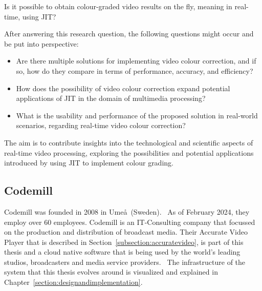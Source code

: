 \documentclass[../MasterThesis.tex]{subfiles}
\begin{document}
	\begin{researchbox}
		Is it possible to obtain colour-graded video results on the fly, meaning in real-time, using JIT?
	\end{researchbox}
	
	After answering this research question, the following questions might occur and be put into perspective:
	
	\begin{itemize}
		\item Are there multiple solutions for implementing video colour correction, and if so, how do they compare in terms of performance, accuracy, and efficiency?
		\item How does the possibility of video colour correction expand potential applications of JIT in the domain of multimedia processing?
		\item What is the usability and performance of the proposed solution in real-world scenarios, regarding real-time video colour correction?
	\end{itemize}
	
	The aim is to contribute insights into the technological and scientific aspects of real-time video processing, exploring the possibilities and potential applications introduced by using JIT to implement colour grading. 
	
	
	
	
	
	
	
	\subsection{Codemill} \label{subsection:codemill}
	
	Codemill was founded in 2008 in Ume\aa \ (Sweden).~\cite{codemill_now, codemill_old, codemill_linkedin}
	As of February 2024, they employ over 60 employees. \cite{codemill} 
	Codemill is an IT-Consulting company that focussed on the production and distribution of broadcast media. Their Accurate Video Player that is described in Section~\ref{subsection:accuratevideo}, is part of this thesis and a cloud native software that is being used by the world's leading studios, broadcasters and media service providers.~\cite{codemill_linkedin, codemill_avp}
	The infrastructure of the system that this thesis evolves around is visualized and explained in Chapter~\ref{section:designandimplementation}.
	
\end{document}

